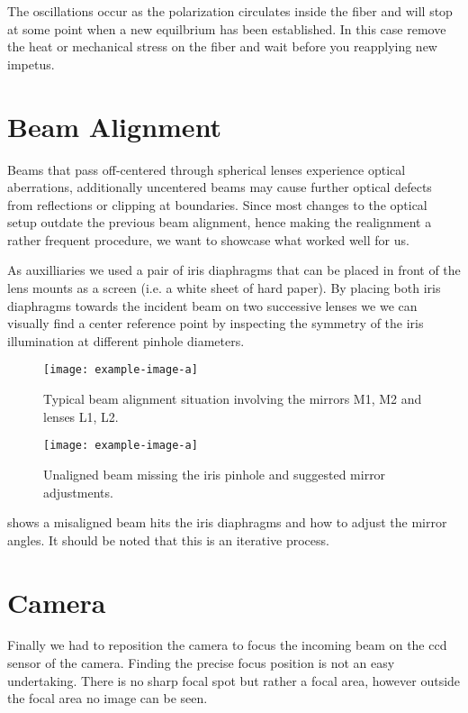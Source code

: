 The oscillations occur as the polarization circulates inside the fiber and
will stop at some point when a new equilbrium has been established. In this
case remove the heat or mechanical stress on the fiber and wait before you
reapplying new impetus.

\section{Beam Alignment}

Beams that pass off-centered through spherical lenses experience optical
aberrations, additionally uncentered beams may cause further optical defects
from reflections or clipping at boundaries. Since most changes to the optical
setup outdate the previous beam alignment, hence making the realignment
a rather frequent procedure, we want to showcase what worked well for us.

As auxilliaries we used a pair of iris diaphragms that can be placed in front
of the lens mounts as a screen (i.e. a white sheet of hard paper). By placing
both iris diaphragms towards the incident beam on two successive lenses we
we can visually find a center reference point by inspecting the symmetry of
the iris illumination at different pinhole diameters.

\begin{figure}[ht]
  \centering
    \texttt{[image: example-image-a]}
    \caption{Typical beam alignment situation involving the mirrors M1, M2 and
    lenses L1, L2.}
    \label{fig:beamalign:setup}
  \endminipage
  \hfill
    \texttt{[image: example-image-a]}
    \caption{Unaligned beam missing the iris pinhole and suggested mirror
    adjustments.}
    \label{fig:beamalign:iris}
  \endminipage
  \hfill
\end{figure}

 shows a misaligned beam hits the iris diaphragms
and how to adjust the mirror angles. It should be noted that this is an
iterative process.

\section{Camera}

Finally we had to reposition the camera to focus the incoming beam on the
\gls{ccd} sensor of the camera. Finding the precise focus position is not an
easy undertaking. There is no sharp focal spot but rather a focal area,
however outside the focal area no image can be seen.

